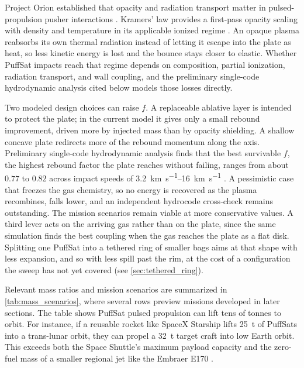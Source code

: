 \documentclass{article}
\begin{document}
Project Orion established that opacity and radiation transport matter in pulsed-propulsion pusher interactions \cite{balcomb1970nuclear}. Kramers' law provides a first-pass opacity scaling with density and temperature in its applicable ionized regime \cite{hansen_kawaler_trimble_stellar_interiors,kippenhahn_weigert_weiss_stellar,pols2011stellar}. An opaque plasma reabsorbs its own thermal radiation instead of letting it escape into the plate as heat, so less kinetic energy is lost and the bounce stays closer to elastic. Whether PuffSat impacts reach that regime depends on composition, partial ionization, radiation transport, and wall coupling, and the preliminary single-code hydrodynamic analysis cited below models those losses directly.

Two modeled design choices can raise $f$. A replaceable ablative layer is intended to protect the plate; in the current model it gives only a small rebound improvement, driven more by injected mass than by opacity shielding. A shallow concave plate redirects more of the rebound momentum along the axis. Preliminary single-code hydrodynamic analysis finds that the best survivable $f$, the highest rebound factor the plate reaches without failing, ranges from about $0.77$ to $0.82$ across impact speeds of \SIrange{3.2}{16}{\kilo\meter\per\second} \cite{Katz_puffsat_impact_sim_2026}. A pessimistic case that freezes the gas chemistry, so no energy is recovered as the plasma recombines, falls lower, and an independent hydrocode cross-check remains outstanding. The mission scenarios remain viable at more conservative values. A third lever acts on the arriving gas rather than on the plate, since the same simulation finds the best coupling when the gas reaches the plate as a flat disk. Splitting one PuffSat into a tethered ring of smaller bags aims at that shape with less expansion, and so with less spill past the rim, at the cost of a configuration the sweep has not yet covered (see \autoref{sec:tethered_ring}).

Relevant mass ratios and mission scenarios are summarized in \autoref{tab:mass_scenarios}, where several rows preview missions developed in later sections. The table shows PuffSat pulsed propulsion can lift tens of tonnes to orbit. For instance, if a reusable rocket like SpaceX Starship \cite{starship} lifts \SI{25}{\tonne} of PuffSats into a trans-lunar orbit, they can propel a  \SI{32}{\tonne} target craft into low Earth orbit. This exceeds both the Space Shuttle's maximum payload capacity \cite{nasa_wings_in_orbit} and the zero-fuel mass of a smaller regional jet like the Embraer E170 \cite{embraer_e170}.
\end{document}
